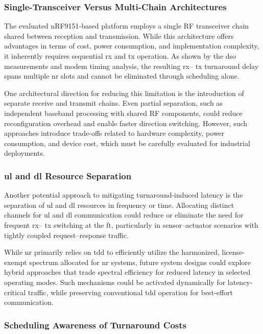 \documentclass[conference]{IEEEtran}
\begin{document}
\subsubsection{Single-Transceiver Versus Multi-Chain Architectures}

The evaluated nRF9151-based platform employs a single RF transceiver chain shared between reception and transmission. While this architecture offers advantages in terms of cost, power consumption, and implementation complexity, it inherently requires sequential  \gls{rx} and  \gls{tx} operation. As shown by the \gls{dso} measurements and modem timing analysis, the resulting  \gls{rx}-- \gls{tx} turnaround delay spans multiple \gls{nr} slots and cannot be eliminated through scheduling alone.

One architectural direction for reducing this limitation is the introduction of separate receive and transmit chains. Even partial separation, such as independent baseband processing with shared RF components, could reduce reconfiguration overhead and enable faster direction switching. However, such approaches introduce trade-offs related to hardware complexity, power consumption, and device cost, which must be carefully evaluated for industrial deployments.

\subsubsection{\gls{ul} and \gls{dl} Resource Separation}

Another potential approach to mitigating turnaround-induced latency is the separation of \gls{ul} and \gls{dl} resources in frequency or time. Allocating distinct channels for \gls{ul} and \gls{dl} communication could reduce or eliminate the need for frequent  \gls{rx}-- \gls{tx} switching at the \gls{ft}, particularly in sensor--actuator scenarios with tightly coupled request--response traffic.

While \gls{nr} primarily relies on \gls{tdd} to efficiently utilize the harmonized, license-exempt spectrum allocated for \gls{nr} systems, future system designs could explore hybrid approaches that trade spectral efficiency for reduced latency in selected operating modes. Such mechanisms could be activated dynamically for latency-critical traffic, while preserving conventional \gls{tdd} operation for best-effort communication.


\subsubsection{Scheduling Awareness of Turnaround Costs}
\end{document}
